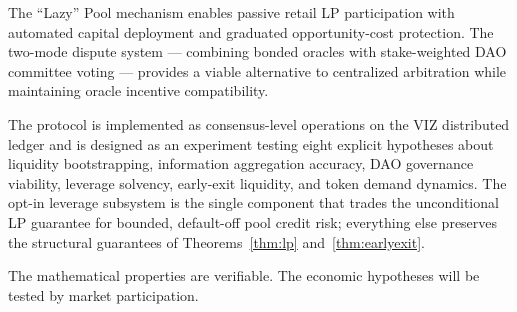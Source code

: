 \documentclass{ledger}
\theoremstyle{plain}
\theoremstyle{remark}
\begin{document}
The ``Lazy'' Pool mechanism enables passive retail LP participation with
automated capital deployment and graduated opportunity-cost protection. The
two-mode dispute system --- combining bonded oracles with stake-weighted DAO
committee voting --- provides a viable alternative to centralized arbitration
while maintaining oracle incentive compatibility.

The protocol is implemented as consensus-level operations on the VIZ distributed
ledger and is designed as an experiment testing eight explicit hypotheses about
liquidity bootstrapping, information aggregation accuracy, DAO governance
viability, leverage solvency, early-exit liquidity, and token demand dynamics.
The opt-in leverage subsystem is the single component that trades the
unconditional LP guarantee for bounded, default-off pool credit risk; everything
else preserves the structural guarantees of Theorems~\ref{thm:lp}
and~\ref{thm:earlyexit}.

The mathematical properties are verifiable. The economic hypotheses will be
tested by market participation.
\end{document}
